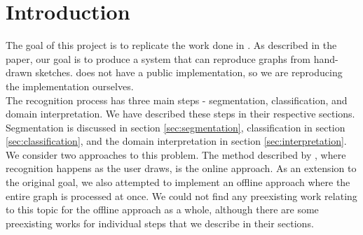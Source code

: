 \section{Introduction}

The goal of this project is to replicate the work done in \citeauthor{daly2015hand} \cite{daly2015hand}. As described in the paper, our goal is to produce a system that can reproduce graphs from hand-drawn sketches. \citeauthor{daly2015hand} does not have a public implementation, so we are reproducing the implementation ourselves. \\

The recognition process has three main steps - segmentation, classification, and domain interpretation. We have described these steps in their respective sections. Segmentation is discussed in section \ref{sec:segmentation}, classification in section \ref{sec:classification}, and the domain interpretation in section \ref{sec:interpretation}. \\

We consider two approaches to this problem. The method described by \citeauthor{daly2015hand}, where recognition happens as the user draws, is the online approach. As an extension to the original goal, we also attempted to implement an offline approach where the entire graph is processed at once. We could not find any preexisting work relating to this topic for the offline approach as a whole, although there are some preexisting works for individual steps that we describe in their sections.
